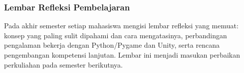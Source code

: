 \subsubsection{Lembar Refleksi Pembelajaran}

Pada akhir semester setiap mahasiswa mengisi lembar refleksi yang memuat:
konsep yang paling sulit dipahami dan cara mengatasinya, perbandingan
pengalaman bekerja dengan Python/Pygame dan Unity, serta rencana pengembangan
kompetensi lanjutan. Lembar ini menjadi masukan perbaikan perkuliahan pada
semester berikutnya.
